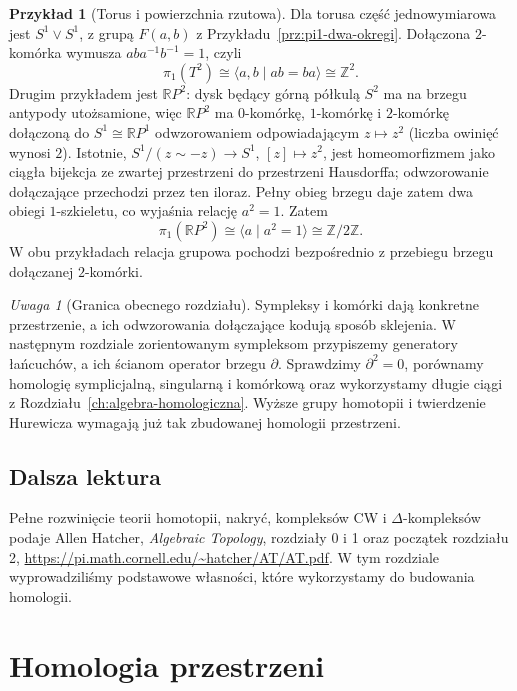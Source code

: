 \documentclass[11pt,a4paper,oneside]{report}
\newcommand{\R}{\mathbb{R}}
\newcommand{\Z}{\mathbb{Z}}
\theoremstyle{plain}
\theoremstyle{definition}
\newtheorem{przyklad}[twierdzenie]{Przykład}
\theoremstyle{remark}
\newtheorem{uwaga}[twierdzenie]{Uwaga}
\begin{document}
\begin{przyklad}[Torus i powierzchnia rzutowa]
\label{prz:pi1-torus-rp2}
Dla torusa część jednowymiarowa
jest $S^1\vee S^1$, z grupą
$F(a,b)$ z Przykładu~\ref{prz:pi1-dwa-okregi}.
Dołączona $2$-komórka wymusza
$aba^{-1}b^{-1}=1$, czyli
\[
 \pi_1(T^2)\cong
 \langle a,b\mid ab=ba\rangle
 \cong\Z^2.
\]
Drugim przykładem jest
$\R P^2$: dysk będący górną
półkulą $S^2$ ma na brzegu
antypody utożsamione, więc
$\R P^2$ ma $0$-komórkę,
      $1$-komórkę i $2$-komórkę
      dołączoną do $S^1\cong\R P^1$
      odwzorowaniem odpowiadającym
      $z\mapsto z^2$ (liczba owinięć wynosi $2$).
      Istotnie, $S^1/(z\sim-z)\to S^1$, $[z]\mapsto z^2$,
      jest homeomorfizmem jako ciągła bijekcja ze zwartej
      przestrzeni do przestrzeni Hausdorffa; odwzorowanie dołączające
      przechodzi przez ten iloraz. Pełny obieg brzegu daje zatem dwa obiegi
      $1$-szkieletu, co wyjaśnia relację $a^2=1$.
      Zatem
\[
 \pi_1(\R P^2)
 \cong\langle a\mid a^2=1\rangle
 \cong\Z/2\Z.
\]
W obu przykładach relacja grupowa pochodzi bezpośrednio
z przebiegu brzegu dołączanej $2$-komórki.
\end{przyklad}

\begin{uwaga}[Granica obecnego rozdziału]
Sympleksy i komórki dają
konkretne przestrzenie, a ich
odwzorowania dołączające kodują sposób
sklejenia. W następnym rozdziale
zorientowanym sympleksom przypiszemy
generatory łańcuchów, a ich ścianom
operator brzegu $\partial$.
Sprawdzimy $\partial^2=0$,
porównamy homologię symplicjalną,
singularną i komórkową oraz
wykorzystamy długie ciągi
z Rozdziału~\ref{ch:algebra-homologiczna}.
Wyższe grupy homotopii i twierdzenie
Hurewicza wymagają już tak
zbudowanej homologii przestrzeni.
\end{uwaga}

\section*{Dalsza lektura}
Pełne rozwinięcie teorii homotopii,
nakryć, kompleksów CW i
$\Delta$-kompleksów podaje
Allen Hatcher, \emph{Algebraic Topology},
rozdziały 0 i 1 oraz początek rozdziału 2,
\url{https://pi.math.cornell.edu/~hatcher/AT/AT.pdf}.
W tym rozdziale wyprowadziliśmy
podstawowe własności, które
wykorzystamy do budowania homologii.

\clearpage

\chapter{Homologia przestrzeni}
\label{ch:homologia-przestrzeni}
\end{document}
